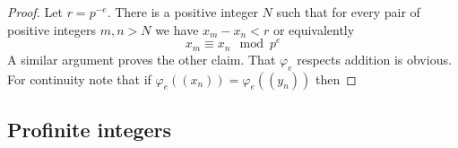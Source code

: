 \documentclass[12pt]{article}
\theoremstyle{definition}
\theoremstyle{remark}
\begin{document}
    \begin{proof}
        Let $r=p^{-e}$. There is a positive integer $N$ such that for every pair of positive integers $m,n> N$ we have $x_m-x_n<r$ or equivalently
        $$x_m\equiv x_n \mod p^e$$
        A similar argument proves the other claim. That $\varphi_e$ respects addition is obvious. For continuity note that if $\varphi_e((x_n))=\varphi_e((y_n))$ then 
    \end{proof}

    \subsection{Profinite integers}

    \printbibliography
\end{document}

